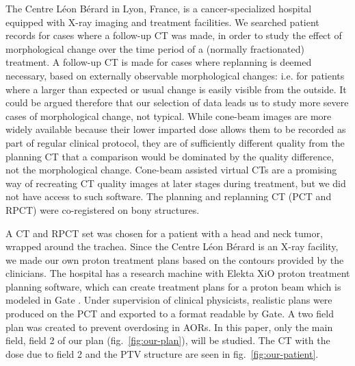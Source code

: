 \documentclass[a4paper,english]{article}
\begin{document}
The Centre L\'eon B\'erard in Lyon, France, is a cancer-specialized hospital equipped with X-ray imaging and treatment facilities. We searched patient records for cases where a follow-up CT was made, in order to study the effect of morphological change over the time period of a (normally fractionated) treatment. A follow-up CT is made for cases where replanning is deemed necessary, based on externally observable morphological changes: i.e. for patients where a larger than expected or usual change is easily visible from the outside. It could be argued therefore that our selection of data leads us to study more severe cases of morphological change, not typical. While cone-beam images are more widely available because their lower imparted dose allows them to be recorded as part of regular clinical protocol, they are of sufficiently different quality from the planning CT that a comparison would be dominated by the quality difference, not the morphological change. Cone-beam assisted virtual CTs are a promising way of recreating CT quality images at later stages during treatment, but we did not have access to such software. The planning and replanning CT (PCT and RPCT) were co-registered on bony structures.

A CT and RPCT set was chosen for a patient with a head and neck tumor, wrapped around the trachea. Since the Centre L\'eon B\'erard is an X-ray facility, we made our own proton treatment plans based on the contours provided by the clinicians. The hospital has a research machine with Elekta XiO proton treatment planning software, which can create treatment plans for a proton beam which is modeled in Gate \citep{Grevillot2012}. Under supervision of clinical physicists, realistic plans were produced on the PCT and exported to a format readable by Gate. A two field plan was created to prevent overdosing in AORs. In this paper, only the main field, field 2 of our plan (fig.~\ref{fig:our-plan}), will be studied. The CT with the dose due to field 2 and the PTV structure are seen in fig.~\ref{fig:our-patient}.
\end{document}
